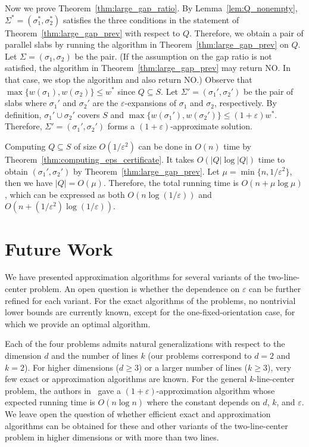 \documentclass[english,a4paper, cleveref, autoref, thm-restate, nolineno]{socg-lipics-v2021}
\theoremstyle{star}
\theoremstyle{claimstar}
\newcommand{\eps}{\ensuremath{\varepsilon}}
\begin{document}
Now we prove Theorem~\ref{thm:large_gap_ratio}.
By Lemma~\ref{lem:Q_nonempty}, $\Sigma^*=(\sigma_1^*, \sigma_2^*)$ satisfies the three conditions in the statement of Theorem~\ref{thm:large_gap_prev} with respect to $Q$. 
Therefore, we obtain a pair of parallel slabs by running the algorithm in Theorem~\ref{thm:large_gap_prev} on $Q$. 
Let $\Sigma=(\sigma_1, \sigma_2)$ be the pair. (If the assumption on the gap ratio is not satisfied, the algorithm in Theorem~\ref{thm:large_gap_prev} may return NO. In that case, we stop the algorithm and also return NO.) 
Observe that $\max\{w(\sigma_1), w(\sigma_2) \} \le w^*$ since $Q\subseteq S$. 
Let $\Sigma'= (\sigma_1', \sigma_2')$ be the pair of slabs where $\sigma_1'$ and  $\sigma_2'$ are the $\eps$-expansions of $\sigma_1$ and $\sigma_2$, respectively.
By definition, $\sigma_1'\cup \sigma_2'$ covers $S$ and $\max \{w(\sigma_1'), w(\sigma_2') \} \le (1+\eps)w^*$. 
Therefore, $\Sigma'= (\sigma_1', \sigma_2')$ forms a $(1+\eps)$-approximate solution. 

Computing $Q\subseteq S$ of size $O(1/\eps^2)$ can be done in $O(n)$ time by Theorem~\ref{thm:computing_eps_certificate}.
It takes $O(|Q|\log |Q|)$ time to obtain $(\sigma_1', \sigma_2')$ by Theorem~\ref{thm:large_gap_prev}. 
Let $\mu = \min \{n, 1/\eps^2\}$, then we have $|Q| = O(\mu)$. 
Therefore, the total running time is $O(n + \mu \log \mu)$, which can be expressed as both $O(n \log (1/\eps))$ and $O(n + (1/\eps^2) \log (1/\eps))$. 






\section{Future Work}

We have presented approximation algorithms for several variants of the two-line-center problem. An open question is whether the dependence on $\eps$ can be further refined for each variant. For the exact algorithms of the problems, no nontrivial lower bounds are currently known, except for the one-fixed-orientation case, for which we provide an optimal algorithm.

Each of the four problems admits natural generalizations with respect to the dimension $d$ and the number of lines $k$ (our problems correspond to $d=2$ and $k=2$). For higher dimensions ($d \ge 3$) or a larger number of lines ($k \ge 3$), very few exact or approximation algorithms are known. 
For the general $k$-line-center problem, the authors in~\cite{agarwal2005approximation} gave a $(1+\eps)$-approximation algorithm whose expected running time is $O(n\log n)$ where the constant depends on $d$, $k$, and $\eps$. 
We leave open the question of whether efficient exact and approximation algorithms can be obtained for these and other variants of the two-line-center problem in higher dimensions or with more than two lines.
\end{document}
